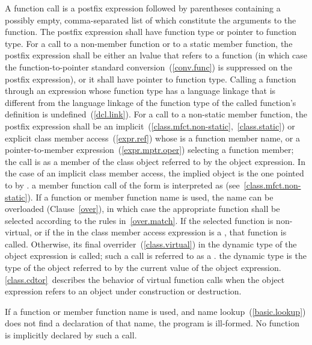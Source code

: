 \pnum
{}%
%
%
A function call is a postfix expression followed by parentheses
containing a possibly empty, comma-separated list of
 which
constitute the arguments to the function. The postfix expression shall
have function type or pointer to function type.
For a call to a non-member function or to a static member function,
the postfix expression shall be either an lvalue that refers to a
function (in which case the function-to-pointer standard
conversion~(\ref{conv.func}) is suppressed on the postfix expression),
or it shall have pointer to function type. Calling a function through an
expression whose function type has a language linkage that is different
from the language linkage of the function type of the called function's
definition is undefined~(\ref{dcl.link}). For a call to a non-static
member function,
the postfix expression shall be an
implicit~(\ref{class.mfct.non-static},~\ref{class.static}) or explicit
class member access~(\ref{expr.ref}) whose  is a
function member name, or a pointer-to-member
expression~(\ref{expr.mptr.oper}) selecting a function member; the call is as a member of
the class object referred to by the
object expression. In the case of an implicit class
member access, the implied object is the one pointed to by .
\enternote 
a member function call of the form  is interpreted as
 (see~\ref{class.mfct.non-static}).
\exitnote 
If a function or member function name is used, the name can be
overloaded (Clause~\ref{over}), in which case the appropriate function
shall be selected according to the rules in~\ref{over.match}. If the selected
function is non-virtual, or if the  in the class
member access expression is a , that function is
called. Otherwise, its final overrider~(\ref{class.virtual}) in the dynamic type
of the object expression is called; such a call is referred to as a
.
\enternote 
the dynamic type is the type of the object referred to by the
current value of the object expression. \ref{class.cdtor}~describes the
behavior of virtual function calls when the object expression
refers to
an object under construction or destruction.
\exitnote 

\pnum
\enternote
If a function or member function name is used, and name
lookup~(\ref{basic.lookup}) does not find a declaration of that name,
the program is ill-formed. No function is implicitly declared by such a
call.
\exitnote

